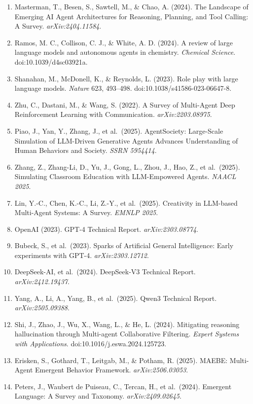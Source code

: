 \begin{enumerate}
\item
  Masterman, T., Besen, S., Sawtell, M., \& Chao, A. (2024). The Landscape of Emerging AI Agent Architectures for Reasoning, Planning, and Tool Calling: A Survey. \emph{arXiv:2404.11584}.
\item
  Ramos, M. C., Collison, C. J., \& White, A. D. (2024). A review of large language models and autonomous agents in chemistry. \emph{Chemical Science}. doi:10.1039/d4sc03921a.
\item
  Shanahan, M., McDonell, K., \& Reynolds, L. (2023). Role play with large language models. \emph{Nature} 623, 493--498. doi:10.1038/s41586-023-06647-8.
\item
  Zhu, C., Dastani, M., \& Wang, S. (2022). A Survey of Multi-Agent Deep Reinforcement Learning with Communication. \emph{arXiv:2203.08975}.
\item
  Piao, J., Yan, Y., Zhang, J., et al.~(2025). AgentSociety: Large-Scale Simulation of LLM-Driven Generative Agents Advances Understanding of Human Behaviors and Society. \emph{SSRN 5954414}.
\item
  Zhang, Z., Zhang-Li, D., Yu, J., Gong, L., Zhou, J., Hao, Z., et al.~(2025). Simulating Classroom Education with LLM-Empowered Agents. \emph{NAACL 2025}.
\item
  Lin, Y.-C., Chen, K.-C., Li, Z.-Y., et al.~(2025). Creativity in LLM-based Multi-Agent Systems: A Survey. \emph{EMNLP 2025}.
\item
  OpenAI (2023). GPT-4 Technical Report. \emph{arXiv:2303.08774}.
\item
  Bubeck, S., et al.~(2023). Sparks of Artificial General Intelligence: Early experiments with GPT-4. \emph{arXiv:2303.12712}.
\item
  DeepSeek-AI, et al.~(2024). DeepSeek-V3 Technical Report. \emph{arXiv:2412.19437}.
\item
  Yang, A., Li, A., Yang, B., et al.~(2025). Qwen3 Technical Report. \emph{arXiv:2505.09388}.
\item
  Shi, J., Zhao, J., Wu, X., Wang, L., \& He, L. (2024). Mitigating reasoning hallucination through Multi-agent Collaborative Filtering. \emph{Expert Systems with Applications}. doi:10.1016/j.eswa.2024.125723.
\item
  Erisken, S., Gothard, T., Leitgab, M., \& Potham, R. (2025). MAEBE: Multi-Agent Emergent Behavior Framework. \emph{arXiv:2506.03053}.
\item
  Peters, J., Waubert de Puiseau, C., Tercan, H., et al.~(2024). Emergent Language: A Survey and Taxonomy. \emph{arXiv:2409.02645}.

\end{enumerate}
